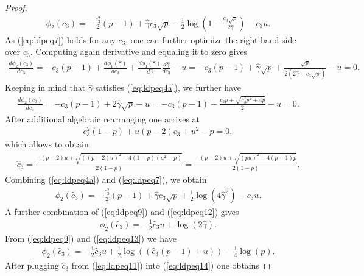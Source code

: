 \documentclass[10pt]{article}
\def\lp{\left (}
\def\rp{\right )}
\begin{document}
\begin{proof}
\begin{eqnarray}
 \label{eq:ldpeq7}
\phi_2(c_3)
=   -\frac{c_{3}^2}{2}(p-1)  +  \hat{ \gamma } c_3\sqrt{p} -\frac{1}{2} \log\lp 1- \frac{c_3\sqrt{p}}{2\hat{\gamma}}\rp
-c_3 u.
  \end{eqnarray}
As (\ref{eq:ldpeq7})  holds for any $c_3$, one can further optimize the right hand side over $c_3$. Computing again derivative and equaling it to zero gives
 \begin{eqnarray}
 \label{eq:ldpeq8}
\frac{d\phi_2(c_3)}{d c_3}
 =   -c_{3}(p-1)  +   \frac{d\phi_1(\hat{\gamma})}{d c_3}+   \frac{d\phi_1(\hat{\gamma})}{d \hat{\gamma}}\frac{d\hat{\gamma}}{d c_3}
- u
 =   -c_{3}(p-1)  +  \hat{\gamma}\sqrt{p} + \frac{\sqrt{p}}{2(2\hat{\gamma} -c_3\sqrt{p}  )}     - u = 0.
  \end{eqnarray}
 Keeping in mind that $\hat{\gamma}$ satisfies (\ref{eq:ldpeq4a}), we further have
 \begin{eqnarray}
 \label{eq:ldpeq9}
\frac{d\phi_2(c_3)}{d c_3}
  =   -c_{3}(p-1)  + 2 \hat{\gamma}\sqrt{p}   - u
  =
 -c_{3}(p-1)  + \frac{c_3 p  +  \sqrt{c_3^2 p^2 +4p} }{2}   - u = 0.
  \end{eqnarray}
After additional algebraic rearranging one arrives at
 \begin{eqnarray}
 \label{eq:ldpeq10}
c_{3}^2(1-p) + u(p-2)c_3  + u^2-p   =0,
  \end{eqnarray}
 which allows to obtain
 \begin{eqnarray}
 \label{eq:ldpeq11}
\hat{c}_{3}   = \frac{ -(p-2)u \pm \sqrt{ ((p-2)u)^2 -4(1-p)(u^2-p)   }   }{2(1-p)}
=\frac{ -(p-2)u \pm \sqrt{ (pu)^2 - 4(p-1)p   }   }{2(1-p)}
.
  \end{eqnarray}
Combining (\ref{eq:ldpeq4a}) and (\ref{eq:ldpeq7}), we obtain
 \begin{eqnarray}
 \label{eq:ldpeq12}
\phi_2(\hat{c}_3)
=   -\frac{c_{3}^2}{2}(p-1)  +  \hat{ \gamma } c_3\sqrt{p} +\frac{1}{2} \log\lp 4 \hat{\gamma}^2\rp
-c_3 u.
  \end{eqnarray}
A further combination of (\ref{eq:ldpeq9}) and (\ref{eq:ldpeq12})  gives
 \begin{eqnarray}
 \label{eq:ldpeq13}
\phi_2(\hat{c}_3)
=  -\frac{1}{2}\hat{c}_3 u + \log\lp 2 \hat{\gamma}\rp.
  \end{eqnarray}
From (\ref{eq:ldpeq9}) and (\ref{eq:ldpeq13}) we have
 \begin{eqnarray}
 \label{eq:ldpeq14}
\phi_2(\hat{c}_3)
=  -\frac{1}{2}\hat{c}_3 u +  \frac{1}{2} \log\lp \lp \hat{c}_3(p-1)+u   \rp \rp  -  \frac{1}{4} \log (p) .
  \end{eqnarray}
After plugging $\hat{c}_3$ from  (\ref{eq:ldpeq11}) into (\ref{eq:ldpeq14}) one obtains

\end{proof}
\end{document}
